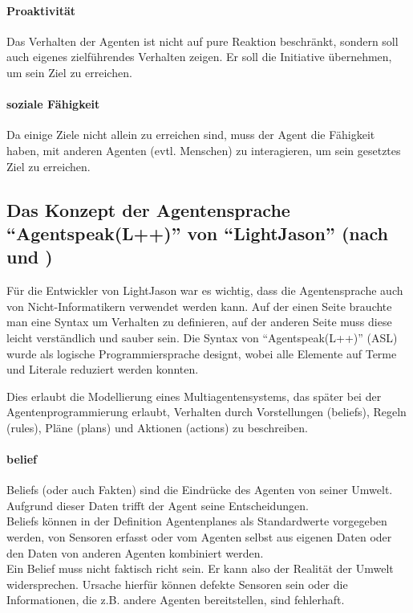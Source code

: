 \paragraph*{Proaktivität} 
Das Verhalten der Agenten ist nicht auf pure Reaktion beschränkt, sondern soll auch eigenes zielführendes Verhalten zeigen. 
Er soll die Initiative übernehmen, um sein Ziel zu erreichen.

\paragraph*{soziale Fähigkeit} 
Da einige Ziele nicht allein zu erreichen sind, muss der Agent die Fähigkeit haben, mit anderen Agenten (evtl. Menschen) zu interagieren, um sein gesetztes Ziel zu erreichen.


\subsection{Das Konzept der Agentensprache \enquote{Agentspeak(L++)} von \enquote{LightJason} (nach \cite{lightjason} und \cite{lightjason-web})}

Für die Entwickler von LightJason war es wichtig, dass die Agentensprache auch von Nicht-Informatikern verwendet werden kann.
Auf der einen Seite brauchte man eine Syntax um Verhalten zu definieren, auf der anderen Seite muss diese leicht verständlich und sauber sein.
Die Syntax von \enquote{Agentspeak(L++)} (ASL) wurde als logische Programmiersprache designt, wobei alle Elemente auf Terme und Literale reduziert werden konnten.

Dies erlaubt die Modellierung eines Multiagentensystems, das später bei der Agentenprogrammierung erlaubt, Verhalten durch Vorstellungen (beliefs), Regeln (rules), Pläne (plans) und Aktionen (actions) zu beschreiben.

\paragraph*{belief}
Beliefs (oder auch Fakten) sind die Eindrücke des Agenten von seiner Umwelt.
Aufgrund dieser Daten trifft der Agent seine Entscheidungen.
\\
Beliefs können in der Definition Agentenplanes als Standardwerte vorgegeben werden, von Sensoren erfasst oder vom Agenten selbst aus eigenen Daten oder den Daten von anderen Agenten kombiniert werden.
\\
Ein Belief muss nicht faktisch richt sein.
Er kann also der Realität der Umwelt widersprechen. 
Ursache hierfür können defekte Sensoren sein oder die Informationen, die z.B. andere Agenten bereitstellen, sind fehlerhaft.

